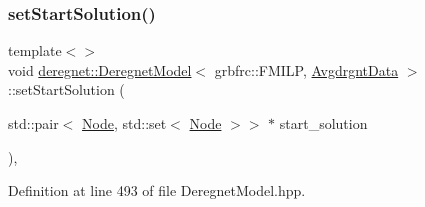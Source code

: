\subsubsection{\texorpdfstring{set\+Start\+Solution()}{setStartSolution()}\hspace{0.1cm}{\footnotesize\ttfamily [3/3]}}
{\footnotesize\ttfamily template$<$$>$ \\
void \hyperlink{classderegnet_1_1DeregnetModel}{deregnet\+::\+Deregnet\+Model}$<$ grbfrc\+::\+F\+M\+I\+LP, \hyperlink{classderegnet_1_1AvgdrgntData}{Avgdrgnt\+Data} $>$\+::set\+Start\+Solution (\begin{DoxyParamCaption}\item[{std\+::pair$<$ \hyperlink{namespacederegnet_a744bad34f2de9856d36715a445f027f3}{Node}, std\+::set$<$ \hyperlink{namespacederegnet_a744bad34f2de9856d36715a445f027f3}{Node} $>$$>$ $\ast$}]{start\+\_\+solution }\end{DoxyParamCaption})\hspace{0.3cm}{\ttfamily [inline]}, {\ttfamily [private]}}



Definition at line 493 of file Deregnet\+Model.\+hpp.


